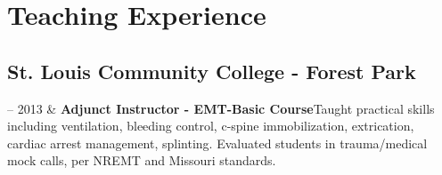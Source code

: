 \documentclass[10pt, letterpaper]{article}
\newcommand{\Duration}[2]{\fontsize{9pt}{0}\selectfont #1 -- #2}
\newcommand{\Twoline}[2]{\textbf{#1}\newline  #2}
\begin{document}

\section{Teaching Experience}



\subsection{St. Louis Community College - Forest Park}


\begin{EntriesTable}
  \Duration{2010}{2013} &
  \Twoline{Adjunct Instructor - EMT-Basic Course}
  {Taught practical skills including ventilation, bleeding control, c-spine immobilization, extrication, cardiac arrest management, splinting. \newline
  Evaluated students in trauma/medical mock calls, per NREMT and Missouri standards.}
\end{EntriesTable}


\end{document}
